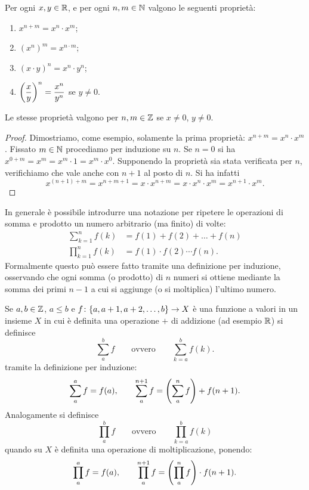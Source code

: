 \begin{theorem}
Per ogni $x,y\in \mathbb R$, e per ogni $n,m \in \mathbb N$
valgono le seguenti proprietà:
\begin{enumerate}
  \item  $x^{n+m} = x^n \cdot x^m$;
  \item $(x^n)^m = x^{n\cdot m}$;
  \item $(x\cdot y)^n = x^n \cdot y^n$;
  \item $\displaystyle {\left( \frac{x}{y} \right)}^n = \frac{x^n}{y^n}$ se $y\neq 0$.
\end{enumerate}
Le stesse proprietà valgono per $n,m \in\mathbb Z$ se $x\neq 0$, $y\neq 0$.
\end{theorem}
%
\begin{proof}
Dimostriamo, come esempio, solamente la prima proprietà: $x^{n+m} = x^n \cdot x^m$.
Fissato $m\in \mathbb N$ procediamo per induzione su $n$.
Se $n=0$ si ha $x^{0+m} = x^m = x^m \cdot 1 = x^m \cdot x^0$.
Supponendo la proprietà sia stata verificata per $n$, verifichiamo
che vale anche con $n+1$ al posto di $n$. Si ha infatti
\[
 x^{(n+1)+m} = x^{n+m+1} = x \cdot x^{n+m} = x \cdot x^n \cdot x^m
  = x^{n+1} \cdot x^m.
\]
\end{proof}




In generale è possibile introdurre una notazione per ripetere le operazioni
di somma e prodotto un numero arbitrario (ma finito) di volte:
\begin{align*}
  \sum_{k=1}^n f(k) &= f(1) + f(2) + \dots + f(n) \\
  \prod_{k=1}^n f(k) &= f(1) \cdot f(2) \cdots f(n).
\end{align*}
Formalmente questo può essere fatto tramite una definizione per induzione,
osservando che ogni somma (o prodotto) di $n$ numeri si ottiene mediante
la somma dei primi $n-1$ a cui si aggiunge (o si moltiplica) l'ultimo numero.

\begin{definition}
\label{def:sommatoria}%
%
Se $a,b\in \mathbb Z$, $a\le b$ e $f\colon {\left\{ a, a+1, a+2, \dots, b \right\}}\to X$
è una funzione a valori in un insieme $X$ in cui è definita una
operazione $+$ di addizione (ad esempio $\mathbb R$)
si definisce
\[
  \sum_a^b f
  \qquad \text{ovvero} \qquad
  \sum_{k=a}^b f(k).
\]
tramite la definizione per induzione:
\[
    \displaystyle \sum_a^a f = f(a), \qquad
    \displaystyle \sum_{a}^{n+1} f = {\left( \sum_a^n f \right)} + f(n+1).
\]
Analogamente si definisce
\[
  \prod_a^b f
  \qquad\text{ovvero}\qquad
  \prod_{k=a}^b f(k)
\]
quando su $X$ è definita una operazione di moltiplicazione,
ponendo:
\[
    \displaystyle \prod_{a}^a f = f(a), \qquad
    \displaystyle \prod_{a}^{n+1} f = {\left( \prod_a^n f \right)} \cdot f(n+1).
\]
\end{definition}

